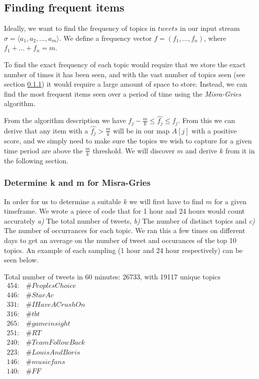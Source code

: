 \subsection{Finding frequent items}\label{algo-frequent}
Ideally, we want to find the frequency of topics in $tweets$ in our input stream $\sigma = \langle a_{1}, a_{2},...,a_{m}\rangle$. We define a frequency vector $f = (f_{1},...,f_{n})$, where $f_{1} + ... + f_{n} = m$. 

To find the exact frequency of each topic would require that we store the exact number of times it has been seen, and with the vast number of topics seen (see section \ref{frequent-determine}) it would require a large amount of space to store. Instead, we can find the most frequent items seen over a period of time using the \textit{Misra-Gries} algorithm.\cite{Amit}
\newline

From the algorithm description we have $f_j - \frac{m}{k} \leq \hat{f_j} \leq f_j$. From this we can derive that any item with a $\hat{f_j} > \frac{m}{k}$ will be in our map $A[j]$ with a positive score, and we simply need to make sure the topics we wish to capture for a given time period are above the $\frac{m}{k}$ threshold. We will discover $m$ and derive $k$ from it in the following section.

\subsubsection{Determine k and m for Misra-Gries}
\label{frequent-determine}
In order for us to determine a suitable $k$ we will first have to find $m$ for a given timeframe. We wrote a piece of code that for 1 hour and 24 hours would count accurately \textit{a)} The total number of tweets, \textit{b)} The number of distinct topics and \textit{c)} The number of occurrances for each topic. We ran this a few times on different days to get an average on the number of tweet and occurances of the top 10 topics. An example of each sampling (1 hour and 24 hour respectively) can be seen below.\newline

Total number of tweets in 60 minutes: 26733, with 19117 unique topics\\

$\begin{array}{ll}
    454: & \#PeoplesChoice \\
    446: & \#StarAc \\
    331: & \#IHaveACrushOn \\
    316: & \#tbt \\
    265: & \#gameinsight \\
    251: & \#RT \\
    240: & \#TeamFollowBack \\
    223: & \#LouisAndBoris \\
    146: & \#musicfans \\
    140: & \#FF \\
\end{array}$
\\
\\

